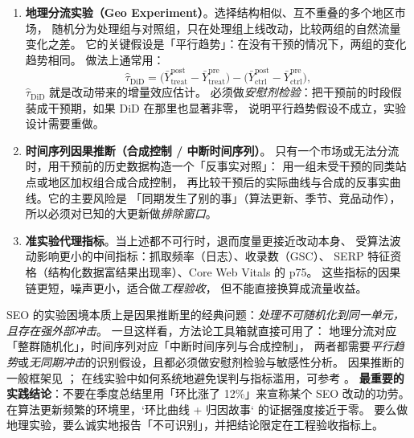 \begin{enumerate}
  \item \textbf{地理分流实验（Geo Experiment）}。选择结构相似、互不重叠的多个地区市场，
        随机分为处理组与对照组，只在处理组上线改动，比较两组的自然流量变化之差。
        它的关键假设是「平行趋势」：在没有干预的情况下，两组的变化趋势相同。
        做法上通常用：
        \begin{equation}
        \hat{\tau}_{\text{DiD}} = \big(\bar{Y}_{\text{treat}}^{\text{post}} - \bar{Y}_{\text{treat}}^{\text{pre}}\big)
        - \big(\bar{Y}_{\text{ctrl}}^{\text{post}} - \bar{Y}_{\text{ctrl}}^{\text{pre}}\big) ,
        \label{eq:did}
        \end{equation}
        $\hat{\tau}_{\text{DiD}}$ 就是改动带来的增量效应估计。
        必须做\emph{安慰剂检验}：把干预前的时段假装成干预期，如果 DiD 在那里也显著非零，
        说明平行趋势假设不成立，实验设计需要重做。
  \item \textbf{时间序列因果推断（合成控制 / 中断时间序列）}。
        只有一个市场或无法分流时，用干预前的历史数据构造一个「反事实对照」：
        用一组未受干预的同类站点或地区加权组合成合成控制，
        再比较干预后的实际曲线与合成的反事实曲线。它的主要风险是
        「同期发生了别的事」（算法更新、季节、竞品动作），所以必须对已知的大更新做\emph{排除窗口}。
  \item \textbf{准实验代理指标}。当上述都不可行时，退而度量更接近改动本身、
        受算法波动影响更小的中间指标：抓取频率（日志）、收录数（GSC）、
        SERP 特征资格（结构化数据富结果出现率）、Core Web Vitals 的 p75。
        这些指标的因果链更短，噪声更小，适合做\emph{工程验收}，
        但不能直接换算成流量收益。
\end{enumerate}

\begin{insight}
SEO 的实验困境本质上是因果推断里的经典问题：\emph{处理不可随机化到同一单元，且存在强外部冲击}。
一旦这样看，方法论工具箱就直接可用了：
地理分流对应「整群随机化」，时间序列对应「中断时间序列与合成控制」，
两者都需要\emph{平行趋势}或\emph{无同期冲击}的识别假设，且都必须做安慰剂检验与敏感性分析。
因果推断的一般框架见 \cite{pearl2009causality}；
在线实验中如何系统地避免误判与指标滥用，可参考 \cite{kohavi2020trustworthy}。
\textbf{最重要的实践结论}：不要在季度总结里用「环比涨了 12\%」来宣称某个 SEO 改动的功劳。
在算法更新频繁的环境里，`环比曲线 + 归因故事` 的证据强度接近于零。
要么做地理实验，要么诚实地报告「不可识别」，并把结论限定在工程验收指标上。
\end{insight}

